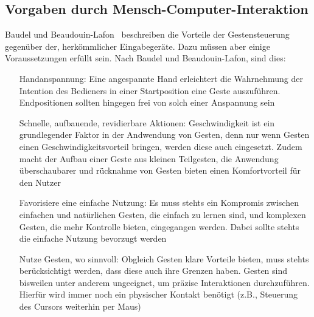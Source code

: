 \subsection{Vorgaben durch Mensch-Computer-Interaktion}
\label{subsec:MCI}
Baudel und Beaudouin-Lafon~\cite{bib:baudel} beschreiben die Vorteile der Gestensteuerung gegen\"uber der, herk\"ommlicher Eingabeger\"ate. Dazu m\"ussen aber einige Voraussetzungen erf\"ullt sein. Nach Baudel und Beaudouin-Lafon, sind dies:
\begin{itemize}
\item[Handanspannung:] Eine angespannte Hand erleichtert die Wahrnehmung der Intention des Bedieners in einer Startposition eine Geste auszuf\"uhren. Endpositionen sollten hingegen frei von solch einer Anspannung sein
\item[Schnelle, aufbauende, revidierbare Aktionen:] Geschwindigkeit ist ein grundlegender Faktor in der Andwendung von Gesten, denn nur wenn Gesten einen Geschwindigkeitsvorteil bringen, werden diese auch eingesetzt. Zudem macht der Aufbau einer Geste aus kleinen Teilgesten, die Anwendung \"uberschaubarer und r\"ucknahme von Gesten bieten einen Komfortvorteil f\"ur den Nutzer
\item[Favorisiere eine einfache Nutzung:] Es muss stehts ein Kompromis zwischen einfachen und nat\"urlichen Gesten, die einfach zu lernen sind, und komplexen Gesten, die mehr Kontrolle bieten, eingegangen werden. Dabei sollte stehts die einfache Nutzung bevorzugt werden
\item[Nutze Gesten, wo sinnvoll:] Obgleich Gesten klare Vorteile bieten, muss stehts ber\"ucksichtigt werden, dass diese auch ihre Grenzen haben. Gesten sind bisweilen unter anderem ungeeignet, um pr\"azise Interaktionen durchzuf\"uhren. Hierf\"ur wird immer noch ein physischer Kontakt ben\"otigt (z.B., Steuerung des Cursors weiterhin per Maus)
\end{itemize}

